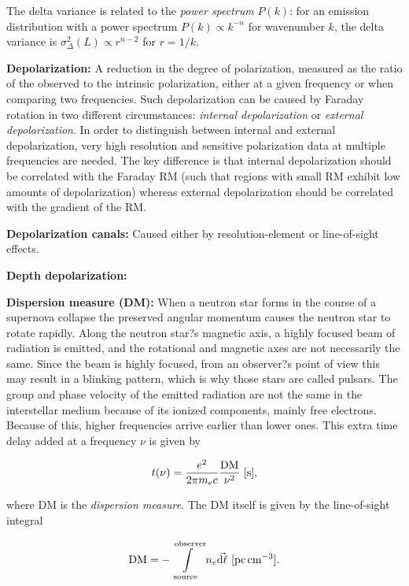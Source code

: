 \documentclass[a4paper,10pt]{article}
\begin{document}
{\noindent}The delta variance is related to the \textit{power spectrum} $P(k)$: for an emission distribution with a power spectrum $P(k)\propto k^{-n}$ for wavenumber $k$, the delta variance is $\sigma_\Delta^2(L)\propto r^{n-2}$ for $r=1/k$.

{\noindent}\textbf{Depolarization:} A reduction in the degree of polarization, measured as the ratio of the observed to the intrinsic polarization, either at a given frequency or when comparing two frequencies. Such depolarization can be caused by Faraday rotation in two different circumstances: \textit{internal depolarization} or \textit{external depolarization}. In order to distinguish between internal and external depolarization, very high resolution and sensitive polarization data at multiple frequencies are needed. The key difference is that internal depolarization should be correlated with the Faraday RM (such that regions with small RM exhibit low amounts of depolarization) whereas external depolarization should be correlated with the gradient of the RM.

{\noindent}\textbf{Depolarization canals:} Caused either by resolution-element or line-of-sight effects.

{\noindent}\textbf{Depth depolarization:}

{\noindent}\textbf{Dispersion measure (DM):} When a neutron star forms in the course of a supernova collapse the preserved angular momentum causes the neutron star to rotate rapidly. Along the neutron star?s magnetic axis, a highly focused beam of radiation is emitted, and the rotational and magnetic axes are not necessarily the same. Since the beam is highly focused, from an observer?s point of view this may result in a blinking pattern, which is why those stars are called pulsars. The group and phase velocity of the emitted radiation are not the same in the interstellar medium because of its ionized components, mainly free electrons. Because of this, higher frequencies arrive earlier than lower ones. This extra time delay added at a frequency $\nu$ is given by

\begin{align*}
	t(\nu) = \frac{e^2}{2\pi m_ec} \frac{\rm DM}{\nu^2} ~ [{\rm s}],
\end{align*}

{\noindent}where DM is the \textit{dispersion measure}. The DM itself is given by the line-of-sight integral

\begin{align*}
    {\rm DM} = -\int\limits_\mathrm{source}^\mathrm{observer} n_e\vec{{\rm d}\ell} ~ [{\rm pc\,cm^{-3}}].
\end{align*}
\end{document}
